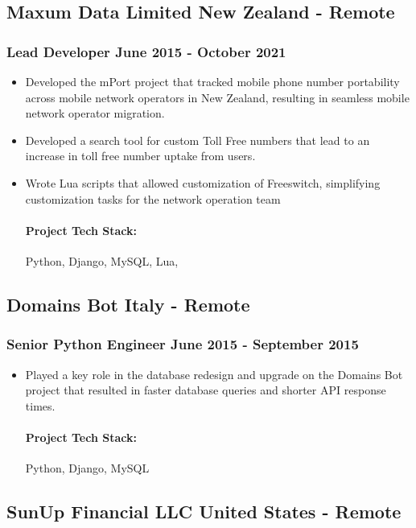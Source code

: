 \documentclass[11pt]{article} %
\begin{document}
\subsection{Maxum Data Limited \hfill New Zealand - Remote}
\subsubsection{Lead Developer \hfill  June 2015 - October 2021}
\begin{itemize}
    \item Developed the mPort project that tracked mobile phone number portability across mobile network operators in New Zealand, resulting in seamless mobile network operator migration.
    \item Developed a search tool for custom Toll Free numbers that lead to an increase in toll free number uptake from users.
    \item Wrote Lua scripts that allowed customization of Freeswitch, simplifying customization tasks for the network operation team 

    \paragraph{Project Tech Stack:} Python, Django, MySQL, Lua,
\end{itemize}

\subsection{Domains Bot \hfill Italy - Remote}
\subsubsection{Senior Python Engineer \hfill  June 2015 - September 2015}
\begin{itemize}
    \item Played a key role in the database redesign and upgrade on the Domains Bot project that resulted in faster database queries and shorter API response times.
    \paragraph{Project Tech Stack:} Python, Django, MySQL
\end{itemize}

\subsection{SunUp Financial LLC \hfill United States - Remote}
\end{document}

